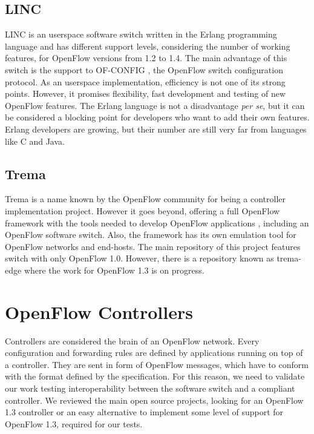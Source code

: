     \subsection{LINC}
    
    LINC \cite{linc} is an userspace software switch written in the Erlang programming language and has different support levels, considering the number of working features, for OpenFlow versions from 1.2 to 1.4. The main advantage of this switch is the support to OF-CONFIG \cite{ofconfig}, the OpenFlow switch configuration protocol. As an userspace implementation, efficiency is not one of its strong points. However, it promises flexibility, fast development and testing of new OpenFlow features. 
    The Erlang language is not a disadvantage \textit{per se}, but it can be considered a blocking point for developers who want to add their own features. Erlang developers are growing, but their number are still very far from languages like C and Java.

    \subsection{Trema}
    
    Trema is a name known by the OpenFlow community for being a controller implementation project. However it goes beyond,  offering a full OpenFlow framework with the tools needed to develop OpenFlow applications \cite{trema}, including an OpenFlow software switch. Also, the framework has its own emulation tool for OpenFlow networks and end-hosts. The main repository of this project features switch with only OpenFlow 1.0. However, there is a repository known as trema-edge where the work for OpenFlow 1.3 is on progress.

\section{OpenFlow Controllers}

    Controllers are considered the brain of an OpenFlow network. Every configuration and forwarding rules are defined by applications running on top of a controller. They are sent in form of OpenFlow messages, which have to conform with the format defined by the specification. For this reason, we need to validate our work testing interoperability between the software switch and a compliant controller. We reviewed the main open source projects, looking for an OpenFlow 1.3 controller or an easy alternative to implement some level of support for OpenFlow 1.3, required for our tests. 


